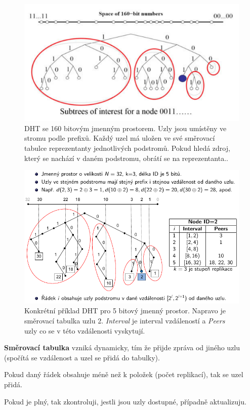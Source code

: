 \begin{figure}[htb!]
    \centering
    \includegraphics[width=1\linewidth]{dht_1.pdf}
    \caption{DHT se 160 bitovým jmenným prostorem. Uzly jsou umístěny ve stromu podle prefixů. Každý uzel má uložen ve své směrovací tabulce reprezentanty jednotlivých podstromů. Pokud hledá zdroj, který se nachází v daném podstromu, obrátí se na reprezentanta..}
\end{figure}

\begin{figure}[htb!]
    \centering
    \includegraphics[width=1\linewidth]{dht_2.pdf}
    \caption{Konkrétní příklad DHT pro 5 bitový jmenný prostor. Napravo je směrovací tabulka uzlu 2. \textit{Interval} je interval vzdáleností a \textit{Peers} uzly co se v této vzdálenosti vyskytují.}
\end{figure}

\begin{compactitem}
    \item \textbf{Směrovací tabulka} vzniká dynamicky, tím že přijde zpráva od jiného uzlu (spočítá se vzdálenost a uzel se přidá do tabulky). \begin{compactitem}
        \item Pokud daný řádek obsahuje méně než k položek (počet replikací), tak se uzel přidá.
        \item Pokud je plný, tak zkontroluji, jestli jsou uzly dostupné, případně aktualizuju.
    \end{compactitem}
\end{compactitem}

